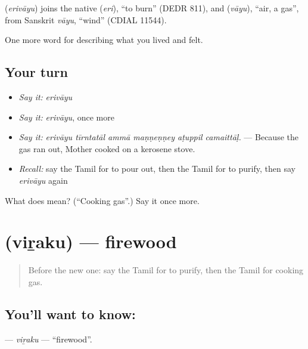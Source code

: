 \begin{cousinweb}
\textbf{} (\emph{erivāyu}) joins the native  (\emph{eri}), \textquotedblleft{}to burn\textquotedblright{} (DEDR 811), and  (\emph{vāyu}), \textquotedblleft{}air, a gas\textquotedblright{}, from Sanskrit \emph{vāyu}, \textquotedblleft{}wind\textquotedblright{} (CDIAL 11544).
\end{cousinweb}

\begin{grammarlens}[title={What you've built}]
One more word for describing what you lived and felt.
\end{grammarlens}

\subsection*{Your turn}
\begin{itemize}
\raggedright
  \item \emph{Say it:} \emph{erivāyu}
  \item \emph{Say it:} \emph{erivāyu}, once more
  \item \emph{Say it:} \emph{erivāyu tīrntatāl ammā maṇṇeṇṇey aṭuppil camaittāḷ.} — Because the gas ran out, Mother cooked on a kerosene stove.
  \item \emph{Recall:} say the Tamil for to pour out, then the Tamil for to purify, then say \emph{erivāyu} again
\end{itemize}

\begin{tcolorbox}[breakable,colback=teal!4,colframe=teal!35!black,title={Before you move on}]
What does  mean? (\textquotedblleft{}Cooking gas\textquotedblright{}.) Say it once more.
\end{tcolorbox}
\section[\texorpdfstring{\ta{விறகு} (viṟaku)}{விறகு (viṟaku)}]{ (viṟaku) — firewood}

\label{lesson:TA-C525-viraku}



\begin{quote}
Before the new one: say the Tamil for to purify, then the Tamil for cooking gas.
\end{quote}

\subsection*{You'll want to know: }
\textbf{} — \emph{viṟaku} — \textquotedblleft{}firewood\textquotedblright{}.

